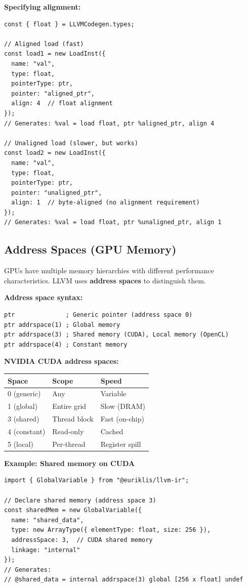 \documentclass[11pt]{article}
\begin{document}
\textbf{Specifying alignment:}
\begin{lstlisting}[style=ts]
const { float } = LLVMCodegen.types;

// Aligned load (fast)
const load1 = new LoadInst({
  name: "val",
  type: float,
  pointerType: ptr,
  pointer: "aligned_ptr",
  align: 4  // float alignment
});
// Generates: %val = load float, ptr %aligned_ptr, align 4

// Unaligned load (slower, but works)
const load2 = new LoadInst({
  name: "val",
  type: float,
  pointerType: ptr,
  pointer: "unaligned_ptr",
  align: 1  // byte-aligned (no alignment requirement)
});
// Generates: %val = load float, ptr %unaligned_ptr, align 1
\end{lstlisting}

\subsection{Address Spaces (GPU Memory)}

GPUs have multiple memory hierarchies with different performance characteristics. LLVM uses \textbf{address spaces} to distinguish them.

\textbf{Address space syntax:}
\begin{lstlisting}[style=ir]
ptr              ; Generic pointer (address space 0)
ptr addrspace(1) ; Global memory
ptr addrspace(3) ; Shared memory (CUDA), Local memory (OpenCL)
ptr addrspace(4) ; Constant memory
\end{lstlisting}

\textbf{NVIDIA CUDA address spaces:}
\begin{center}
\begin{tabular}{|l|l|l|}
\hline
\textbf{Space} & \textbf{Scope} & \textbf{Speed} \\
\hline
0 (generic) & Any & Variable \\
1 (global) & Entire grid & Slow (DRAM) \\
3 (shared) & Thread block & Fast (on-chip) \\
4 (constant) & Read-only & Cached \\
5 (local) & Per-thread & Register spill \\
\hline
\end{tabular}
\end{center}

\textbf{Example: Shared memory on CUDA}
\begin{lstlisting}[style=ts]
import { GlobalVariable } from "@euriklis/llvm-ir";

// Declare shared memory (address space 3)
const sharedMem = new GlobalVariable({
  name: "shared_data",
  type: new ArrayType({ elementType: float, size: 256 }),
  addressSpace: 3,  // CUDA shared memory
  linkage: "internal"
});
// Generates:
// @shared_data = internal addrspace(3) global [256 x float] undef
\end{lstlisting}
\end{document}
